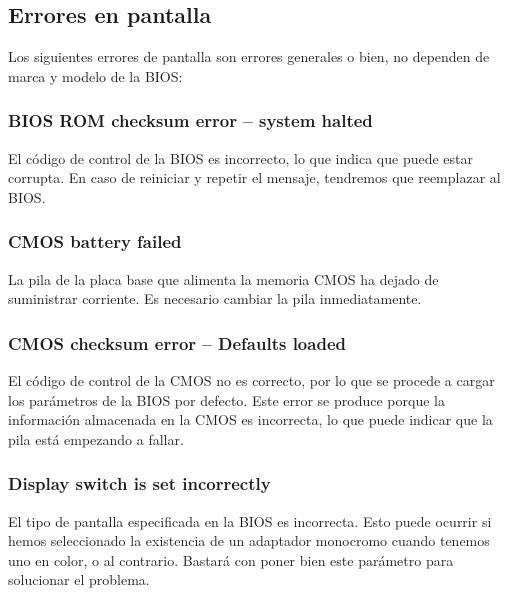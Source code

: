 \documentclass[12pt,oneside,a4paper]{article}
\begin{document}


	\subsection{Errores en pantalla}\label{sub:errores en pantalla}
	
	Los siguientes errores de pantalla son errores generales o bien, no
	dependen de marca y modelo de la BIOS:

		\subsubsection{BIOS ROM checksum error – system halted}

		El código de control de la BIOS es incorrecto, lo que indica que puede
		estar corrupta. En caso de reiniciar y repetir el mensaje, tendremos
		que reemplazar al BIOS.

		\subsubsection{CMOS battery failed}

		La pila de la placa base que alimenta la memoria CMOS ha dejado de
		suministrar corriente. Es necesario cambiar la pila inmediatamente.

		\subsubsection{CMOS checksum error – Defaults loaded}

		El código de control de la CMOS no es correcto, por lo que se
		procede a cargar los parámetros de la BIOS por defecto. Este error
		se produce porque la información almacenada en la CMOS es
		incorrecta, lo que puede indicar que la pila está empezando a
		fallar.

		\subsubsection{Display switch is set incorrectly}

		El tipo de pantalla especificada en la BIOS es incorrecta. Esto puede
		ocurrir si hemos seleccionado la existencia de un adaptador monocromo
		cuando tenemos uno en color, o al contrario. Bastará con poner bien
		este parámetro para solucionar el problema.
\end{document}
